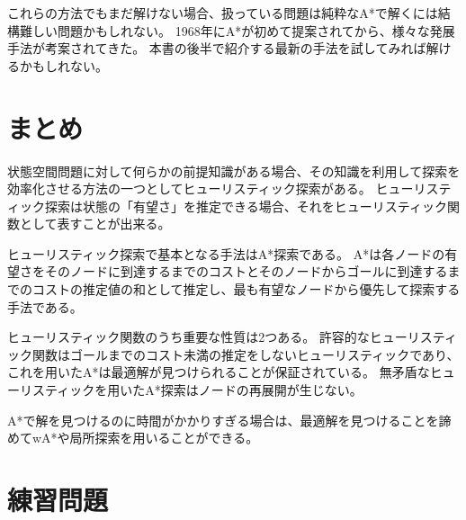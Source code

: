 これらの方法でもまだ解けない場合、扱っている問題は純粋なA*で解くには結構難しい問題かもしれない。
1968年にA*が初めて提案されてから、様々な発展手法が考案されてきた。
本書の後半で紹介する最新の手法を試してみれば解けるかもしれない。

\section{まとめ}

状態空間問題に対して何らかの前提知識がある場合、その知識を利用して探索を効率化させる方法の一つとしてヒューリスティック探索がある。
ヒューリスティック探索は状態の「有望さ」を推定できる場合、それをヒューリスティック関数として表すことが出来る。

ヒューリスティック探索で基本となる手法はA*探索である。
A*は各ノードの有望さをそのノードに到達するまでのコストとそのノードからゴールに到達するまでのコストの推定値の和として推定し、最も有望なノードから優先して探索する手法である。

ヒューリスティック関数のうち重要な性質は2つある。
許容的なヒューリスティック関数はゴールまでのコスト未満の推定をしないヒューリスティックであり、これを用いたA*は最適解が見つけられることが保証されている。
無矛盾なヒューリスティックを用いたA*探索はノードの再展開が生じない。

A*で解を見つけるのに時間がかかりすぎる場合は、最適解を見つけることを諦めてwA*や局所探索を用いることができる。

\section{練習問題}

